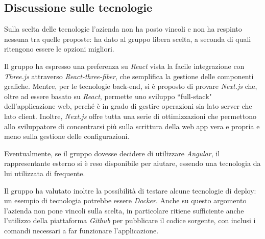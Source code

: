 \subsection{Discussione sulle tecnologie}
Sulla scelta delle tecnologie l'azienda non ha posto vincoli e non ha respinto nessuna tra quelle proposte: ha dato al gruppo libera scelta, a seconda di quali ritengono essere le opzioni migliori.
\par Il gruppo ha espresso una preferenza su \textit{React} vista la facile integrazione con \textit{Three.js} attraverso \textit{React-three-fiber}, che semplifica la gestione delle componenti grafiche. Mentre, per le tecnologie back-end, si è proposto di provare \textit{Next.js} che, oltre ad essere basato su \textit{React}, permette uno sviluppo ``full-stack" dell'applicazione web, perché è in grado di gestire operazioni sia lato server che lato client. Inoltre, \textit{Next.js} offre tutta una serie di ottimizzazioni che permettono allo sviluppatore di concentrarsi più sulla scrittura della web app vera e propria e meno sulla gestione delle configurazioni.
\par Eventualmente, se il gruppo dovesse decidere di utilizzare \textit{Angular}, il rappresentante esterno si è reso disponibile per aiutare, essendo una tecnologia da lui utilizzata di frequente.
\par Il gruppo ha valutato inoltre la possibilità di testare alcune tecnologie di deploy: un esempio di tecnologia potrebbe essere \textit{Docker}. Anche su questo argomento l'azienda non pone vincoli sulla scelta, in particolare ritiene sufficiente anche l'utilizzo della piattaforma \textit{Github} per pubblicare il codice sorgente, con inclusi i comandi necessari a far funzionare l'applicazione.